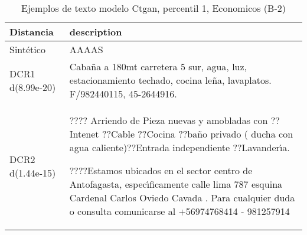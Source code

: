 \begin{table}[H]
\centering
\fontsize{10}{14}\selectfont
\caption{Ejemplos de texto modelo Ctgan, percentil 1, Economicos (B-2)}
\label{table-example-economicos-b-2-ctgan-1p-text}
\begin{tabular}{|l|m{35em}|}
\hline
\rowcolor[gray]{0.8}
Distancia & description \\
\hline Sintético & AAAAS \\
\hline DCR1 d(8.99e-20) & Caba\~na a 180mt carretera 5 sur, agua, luz, estacionamiento techado, cocina le\~na, lavaplatos. F/982440115, 45-2644916. \\
\hline DCR2 d(1.44e-15) & ???? Arriendo de Pieza nuevas y amobladas con 
??Intenet  ??Cable   ??Cocina ??ba\~no privado ( ducha con agua caliente)??Entrada independiente ??Lavander{\'\i}a.

????Estamos ubicados en el sector centro de Antofagasta,  espec{\'\i}ficamente calle lima 787 esquina Cardenal Carlos Oviedo Cavada . Para cualquier duda o consulta comunicarse al +56974768414 - 981257914 \\
\hline
\end{tabular}
\end{table}
